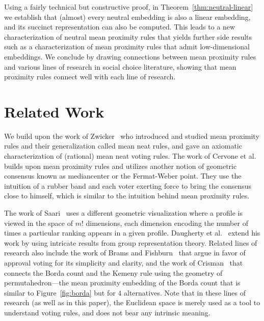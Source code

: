 \documentclass[prodmode]{acmsmall-ec14}
\begin{document}
Using a fairly technical but constructive proof, in Theorem~\ref{thm:neutral-linear} we establish that (almost) every neutral embedding is also a linear embedding, and its succinct representation can also be computed. This leads to a new characterization of neutral mean proximity rules that yields further side results such as a characterization of mean proximity rules that admit low-dimensional embeddings. We conclude by drawing connections between mean proximity rules and various lines of research in social choice literature, showing that mean proximity rules connect well with each line of research. 

\section{Related Work}
\label{sec:related}

We build upon the work of Zwicker~ who introduced and studied mean proximity rules and their generalization called mean neat rules, and gave an axiomatic characterization of (rational) mean neat voting rules. The work of Cervone et al.~ builds upon mean proximity rules and utilizes another notion of geometric consensus known as mediancenter or the Fermat-Weber point. They use the intuition of a rubber band and each voter exerting force to bring the consensus close to himself, which is similar to the intuition behind mean proximity rules. 

The work of Saari~ uses a different geometric visualization where a profile is viewed in the space of $m!$ dimensions, each dimension encoding the number of times a particular ranking appears in a given profile. Daugherty et al.~ extend his work by using intricate results from group representation theory. Related lines of research also include the work of Brams and Fishburn~ that argue in favor of approval voting for its simplicity and clarity, and the work of Crisman~ that connects the Borda count and the Kemeny rule using the geometry of permutahedron---the mean proximity embedding of the Borda count that is similar to Figure~\ref{fig:borda} but for $4$ alternatives. Note that in these lines of research (as well as in this paper), the Euclidean space is merely used as a tool to understand voting rules, and does not bear any intrinsic meaning.

\end{document}
